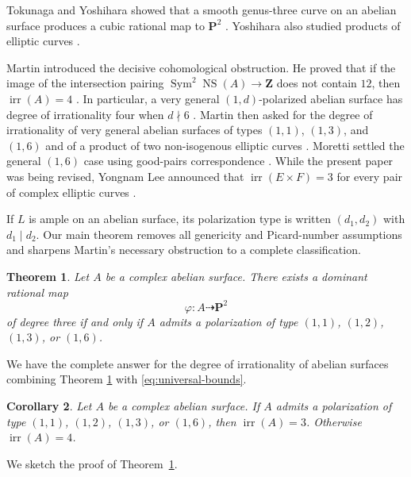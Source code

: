 \documentclass[12pt]{amsart}
\numberwithin{equation}{section}
\newtheorem{theorem}{Theorem}[section]
\newtheorem{corollary}[theorem]{Corollary}
\theoremstyle{definition}
\theoremstyle{remark}
\newcommand{\Z}{\mathbf Z}
\newcommand{\PP}{\mathbf P}
\newcommand{\NS}{\operatorname{NS}}
\newcommand{\irr}{\operatorname{irr}}
\newcommand{\Sym}{\operatorname{Sym}}
\begin{document}
Tokunaga and Yoshihara showed that a smooth genus-three curve on an
abelian surface produces a cubic rational map to $\PP^2$
\cite{TokunagaYoshihara}.  Yoshihara also studied products of elliptic
curves \cite{YoshiharaProduct}.


Martin introduced the decisive cohomological obstruction.  He proved
that if the image of the intersection pairing
$\Sym^2\NS(A)\to\Z$ does not contain $12$, then $\irr(A)=4$
\cite[Theorem~1.1]{Martin}.  In particular, a very general
$(1,d)$-polarized abelian surface has degree of irrationality four when
$d\nmid6$ \cite[Corollary~1.2]{Martin}.  Martin then asked for the
degree of irrationality of very general abelian surfaces of types $(1,1)$,
$(1,3)$, and $(1,6)$ and of a product of two non-isogenous elliptic
curves \cite[Questions~1.4]{Martin}.  Moretti settled the general
$(1,6)$ case using good-pairs correspondence
\cite[Theorem~C(1) and Corollary~3.2]{Moretti}.  While the present paper was being revised, Yongnam Lee announced that
$\irr(E\times F)=3$ for every pair of complex elliptic curves
\cite[Theorem~1.1]{Lee}.

If $L$ is ample on an abelian surface, its polarization type is written
$(d_1,d_2)$ with $d_1\mid d_2$.  Our main theorem removes all
genericity and Picard-number assumptions and sharpens Martin's necessary
obstruction to a complete classification.

\begin{theorem}\label{thm:main}
Let $A$ be a complex abelian surface.  There exists a dominant rational
map
\[
                         \varphi:A\dashrightarrow\PP^2
\]
of degree three if and only if $A$ admits a polarization of type
$(1,1)$, $(1,2)$, $(1,3)$, or $(1,6)$.
\end{theorem}

 We have  the complete answer for the degree of irrationality of  abelian surfaces combining Theorem \ref{thm:main} with \eqref{eq:universal-bounds}.

\begin{corollary}\label{cor:irr-classification}
Let $A$ be a complex abelian surface.  If $A$ admits a polarization of
type $(1,1)$, $(1,2)$, $(1,3)$, or $(1,6)$, then $\irr(A)=3$.
Otherwise $\irr(A)=4$.
\end{corollary}

We sketch the proof of Theorem~\ref{thm:main}.
\end{document}
